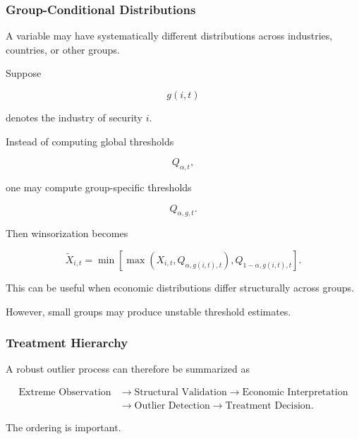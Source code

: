 \documentclass[11pt,a4paper]{article}
\begin{document}
\subsubsection{Group-Conditional Distributions}

A variable may have systematically different distributions across industries,
countries, or other groups.

Suppose

\begin{equation}
g(i,t)
\end{equation}

denotes the industry of security $i$.

Instead of computing global thresholds

\begin{equation}
Q_{\alpha,t},
\end{equation}

one may compute group-specific thresholds

\begin{equation}
Q_{\alpha,g,t}.
\end{equation}

Then winsorization becomes

\begin{equation}
\widetilde{X}_{i,t}
=
\min
\left[
\max
\left(
X_{i,t},
Q_{\alpha,g(i,t),t}
\right),
Q_{1-\alpha,g(i,t),t}
\right].
\end{equation}

This can be useful when economic distributions differ structurally across
groups.

However, small groups may produce unstable threshold estimates.


\subsubsection{Treatment Hierarchy}

A robust outlier process can therefore be summarized as

\begin{equation}
\boxed{
\begin{aligned}
\text{Extreme Observation}
&\rightarrow
\text{Structural Validation}
\rightarrow
\text{Economic Interpretation}
\\[0.1cm]
&\rightarrow
\text{Outlier Detection}
\rightarrow
\text{Treatment Decision}.
\end{aligned}
}
\end{equation}

The ordering is important.
\end{document}
